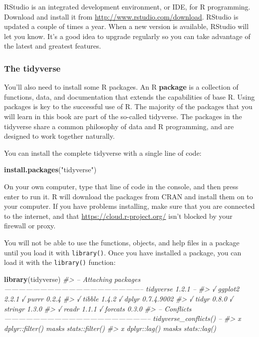 \documentclass[]{article}
\newenvironment{Shaded}{\begin{snugshade}}{\end{snugshade}}
\newcommand{\KeywordTok}[1]{\textcolor[rgb]{0.13,0.29,0.53}{\textbf{#1}}}
\newcommand{\StringTok}[1]{\textcolor[rgb]{0.31,0.60,0.02}{#1}}
\newcommand{\CommentTok}[1]{\textcolor[rgb]{0.56,0.35,0.01}{\textit{#1}}}
\newcommand{\NormalTok}[1]{#1}
\begin{document}
RStudio is an integrated development environment, or IDE, for R
programming. Download and install it from
\url{http://www.rstudio.com/download}. RStudio is updated a couple of
times a year. When a new version is available, RStudio will let you
know. It's a good idea to upgrade regularly so you can take advantage of
the latest and greatest features.

\subsubsection{The tidyverse}\label{the-tidyverse}

You'll also need to install some R packages. An R \textbf{package} is a
collection of functions, data, and documentation that extends the
capabilities of base R. Using packages is key to the successful use of
R. The majority of the packages that you will learn in this book are
part of the so-called tidyverse. The packages in the tidyverse share a
common philosophy of data and R programming, and are designed to work
together naturally.

You can install the complete tidyverse with a single line of code:

\begin{Shaded}
\begin{Highlighting}[]
\KeywordTok{install.packages}\NormalTok{(}\StringTok{"tidyverse"}\NormalTok{)}
\end{Highlighting}
\end{Shaded}

On your own computer, type that line of code in the console, and then
press enter to run it. R will download the packages from CRAN and
install them on to your computer. If you have problems installing, make
sure that you are connected to the internet, and that
\url{https://cloud.r-project.org/} isn't blocked by your firewall or
proxy.

You will not be able to use the functions, objects, and help files in a
package until you load it with \texttt{library()}. Once you have
installed a package, you can load it with the \texttt{library()}
function:

\begin{Shaded}
\begin{Highlighting}[]
\KeywordTok{library}\NormalTok{(tidyverse)}
\CommentTok{#> -- Attaching packages ----------------------------------------------------------- tidyverse 1.2.1 --}
\CommentTok{#> √ ggplot2 2.2.1          √ purrr   0.2.4     }
\CommentTok{#> √ tibble  1.4.2          √ dplyr   0.7.4.9002}
\CommentTok{#> √ tidyr   0.8.0          √ stringr 1.3.0     }
\CommentTok{#> √ readr   1.1.1          √ forcats 0.3.0}
\CommentTok{#> -- Conflicts -------------------------------------------------------------- tidyverse_conflicts() --}
\CommentTok{#> x dplyr::filter() masks stats::filter()}
\CommentTok{#> x dplyr::lag()    masks stats::lag()}
\end{Highlighting}
\end{Shaded}
\end{document}
